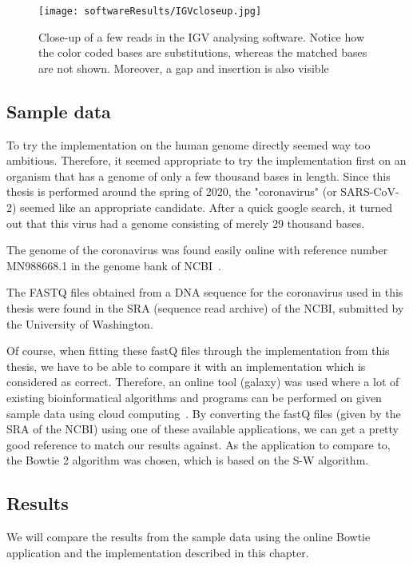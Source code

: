 \begin{figure}[H]
	\centering
	\texttt{[image: softwareResults/IGVcloseup.jpg]}
	\caption{Close-up of a few reads in the IGV analysing software. Notice how the color coded bases are substitutions, whereas the matched bases are not shown. Moreover, a gap and insertion is also visible}
	\label{fig:IGVcloseup}
\end{figure}

\subsection{Sample data}

To try the implementation on the human genome directly seemed way too ambitious. Therefore, it seemed appropriate to try the implementation first on an organism that has a genome of only a few thousand bases in length.
Since this thesis is performed around the spring of 2020, the "coronavirus" (or SARS-CoV-2) seemed like an appropriate candidate. After a quick google search, it turned out that this virus had a genome consisting of merely 29 thousand bases.

The genome of the coronavirus was found easily online with reference number MN988668.1 in the genome bank of NCBI~\cite{8}.

The FASTQ files obtained from a DNA sequence for the coronavirus used in this thesis were found in the SRA (sequence read archive) of the NCBI, submitted by the University of Washington.\cite{NCBI}

Of course, when fitting these fastQ files through the implementation from this thesis, we have to be able to compare it with an implementation which is considered as correct. Therefore, an online tool (galaxy) was used where a lot of existing bioinformatical algorithms and programs can be performed on given sample data using cloud computing~\cite{9}. %
By converting the fastQ files (given by the SRA of the NCBI) using one of these available applications, we can get a pretty good reference to match our results against. As the application to compare to, the Bowtie 2 algorithm was chosen, which is based on the S-W algorithm.

\subsection{Results}

We will compare the results from the sample data using the online Bowtie application and the implementation described in this chapter.

